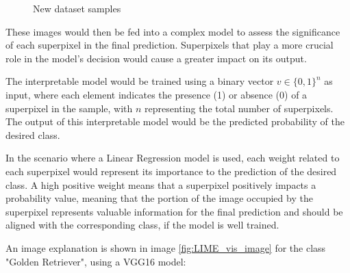 \begin{figure}
\begin{subfigure}[t]{0.31\textwidth}
    \end{subfigure}
    \caption{New dataset samples}
    \label{fig:superpixel_samples}
\end{figure}

These images would then be fed into a complex model to assess the significance of each superpixel in the final prediction. 
Superpixels that play a more crucial role in the model's decision would cause a greater impact on its output.

The interpretable model would be trained using a binary vector \(v \in \{0, 1\}^n\) as input, where each element indicates the presence (1) or absence (0) of a superpixel in the sample, with \(n\) representing the total number of superpixels. 
The output of this interpretable model would be the predicted probability of the desired class.

In the scenario where a Linear Regression model is used, each weight related to each superpixel would represent its importance to the prediction of the desired class.
A high positive weight means that a superpixel positively impacts a probability value, meaning that the portion of the image occupied by the superpixel represents valuable information for the final prediction and should be aligned with the corresponding class, if the model is well trained.

\newpage

An image explanation is shown in image \ref{fig:LIME_vis_image} for the class "Golden Retriever", using a VGG16 \citep{simonyan2015deepconvolutionalnetworkslargescale} model:


